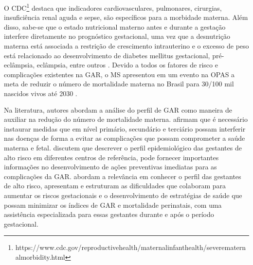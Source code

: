 O \ac{CDC}\footnote{https://www.cdc.gov/reproductivehealth/maternalinfanthealth/severematernalmorbidity.html} destaca que indicadores cardiovasculares, pulmonares, cirurgias, insuficiência renal aguda e sepse, são específicos para a morbidade materna. %
Além disso, sabe-se que o estado nutricional materno antes e durante a gestação interfere diretamente no prognóstico gestacional, uma vez que a desnutrição materna está associada a restrição de crescimento intrauterino e o excesso de peso está relacionado ao desenvolvimento de diabetes mellitus gestacional, pré-eclâmpsia, eclâmpsia, entre outros \cite{oliveira2018}. Devido a todos os fatores de risco e complicações existentes na \ac{GAR}, o \ac{MS} apresentou em um evento na \ac{OPAS} a meta de reduzir o número de mortalidade materna no Brasil para 30/100 mil nascidos vivos até 2030 \cite{valadares2018}. %


Na literatura,  autores abordam a análise do perfil de GAR como maneira de auxiliar na redução do número de mortalidade materna.  afirmam que é necessário instaurar medidas que em nível primário, secundário e terciário possam interferir nas doenças de forma a evitar as complicações que possam comprometer a saúde materna e fetal.  discutem que descrever o perfil epidemiológico das gestantes de alto risco em diferentes centros de referência, pode fornecer importantes informações no desenvolvimento de ações preventivas imediatas para as complicações da \ac{GAR}.  abordam a relevância  em conhecer o perfil das gestantes de alto risco, apresentam e estruturam as dificuldades que colaboram para aumentar os riscos gestacionais e o desenvolvimento de estratégias de saúde que possam minimizar os índices de \ac{GAR} e mortalidade perinatais, com uma assistência especializada para essas gestantes durante e após o período gestacional. 


